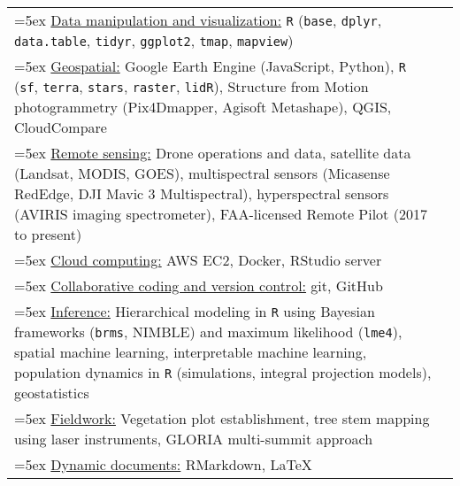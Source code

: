 \begin{longtable}{@{}>{\raggedright}p{6.25in} >{\raggedleft}X@{}}

\hangindent=5ex \underline{Data manipulation and visualization:} \texttt{R} (\texttt{base}, \texttt{dplyr}, \texttt{data.table}, \texttt{tidyr}, \texttt{ggplot2}, \texttt{tmap}, \texttt{mapview}) & \tabularnewline
\hangindent=5ex \underline{Geospatial:} Google Earth Engine (JavaScript, Python), \texttt{R} (\texttt{sf}, \texttt{terra}, \texttt{stars}, \texttt{raster},  \texttt{lidR}), Structure from Motion photogrammetry (Pix4Dmapper, Agisoft Metashape), QGIS, CloudCompare & \tabularnewline
\hangindent=5ex \underline{Remote sensing:} Drone operations and data, satellite data (Landsat, MODIS, GOES), multispectral sensors (Micasense RedEdge, DJI Mavic 3 Multispectral), hyperspectral sensors (AVIRIS imaging spectrometer), FAA-licensed Remote Pilot (2017 to present) & \tabularnewline
\hangindent=5ex \underline{Cloud computing:} AWS EC2, Docker, RStudio server & \tabularnewline
\hangindent=5ex \underline{Collaborative coding and version control:} git, GitHub & \tabularnewline
\hangindent=5ex \underline{Inference:} Hierarchical modeling in \texttt{R} using Bayesian frameworks (\texttt{brms}, NIMBLE) and maximum likelihood (\texttt{lme4}), spatial machine learning, interpretable machine learning, population dynamics in \texttt{R} (simulations, integral projection models), geostatistics & \tabularnewline
\hangindent=5ex \underline{Fieldwork:} Vegetation plot establishment, tree stem mapping using laser instruments, GLORIA multi-summit approach & \tabularnewline
\hangindent=5ex \underline{Dynamic documents:} RMarkdown, \LaTeX{} & \tabularnewline

\end{longtable}